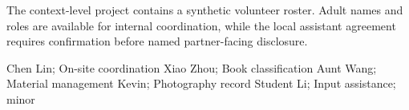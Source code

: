 \documentclass[letterpaper]{article}
\begin{document}
\begin{tcolorbox}[casepanel,title={\texttt{rosters/volunteer-roster.csv}\hfill\normalfont Base workspace}]
\scriptsize\ttfamily
The context-level project contains a synthetic volunteer roster. Adult names and roles are available for internal coordination, while the local assistant agreement requires confirmation before named partner-facing disclosure.

\vspace{0.2em}
\begin{tcolorbox}[colback=white,colframe=caseouterframe,boxrule=0.35pt,arc=0.8mm,left=1mm,right=1mm,top=0.8mm,bottom=0.8mm,boxsep=0pt]
\ttfamily\scriptsize
Chen Lin; On-site coordination\newline
Xiao Zhou; Book classification\newline
Aunt Wang; Material management\newline
Kevin; Photography record\newline
Student Li; Input assistance; minor
\end{tcolorbox}
\end{tcolorbox}
\end{document}

